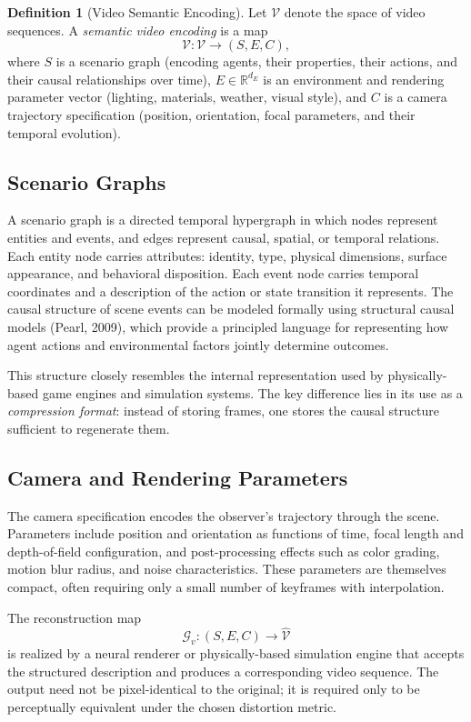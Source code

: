 \documentclass[11pt,a4paper]{article}
\theoremstyle{definition}
\newtheorem{definition}[theorem]{Definition}
\theoremstyle{remark}
\begin{document}
\begin{definition}[Video Semantic Encoding]
Let $\mathcal{V}$ denote the space of video sequences. A \emph{semantic video encoding} is a map
\[
\mathcal{V} : \mathcal{V} \rightarrow (S, E, C),
\]
where $S$ is a scenario graph (encoding agents, their properties, their actions, and their causal relationships over time), $E \in \mathbb{R}^{d_E}$ is an environment and rendering parameter vector (lighting, materials, weather, visual style), and $C$ is a camera trajectory specification (position, orientation, focal parameters, and their temporal evolution).
\end{definition}

\subsection{Scenario Graphs}

A scenario graph is a directed temporal hypergraph in which nodes represent entities and events, and edges represent causal, spatial, or temporal relations. Each entity node carries attributes: identity, type, physical dimensions, surface appearance, and behavioral disposition. Each event node carries temporal coordinates and a description of the action or state transition it represents. The causal structure of scene events can be modeled formally using structural causal models (Pearl, 2009), which provide a principled language for representing how agent actions and environmental factors jointly determine outcomes.

This structure closely resembles the internal representation used by physically-based game engines and simulation systems. The key difference lies in its use as a \emph{compression format}: instead of storing frames, one stores the causal structure sufficient to regenerate them.

\subsection{Camera and Rendering Parameters}

The camera specification encodes the observer's trajectory through the scene. Parameters include position and orientation as functions of time, focal length and depth-of-field configuration, and post-processing effects such as color grading, motion blur radius, and noise characteristics. These parameters are themselves compact, often requiring only a small number of keyframes with interpolation.

The reconstruction map
\[
\mathcal{G}_v : (S, E, C) \rightarrow \widehat{\mathcal{V}}
\]
is realized by a neural renderer or physically-based simulation engine that accepts the structured description and produces a corresponding video sequence. The output need not be pixel-identical to the original; it is required only to be perceptually equivalent under the chosen distortion metric.
\end{document}
